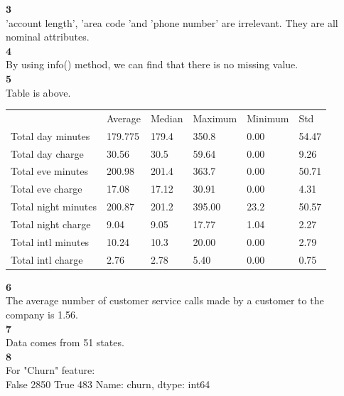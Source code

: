 \documentclass[12pt]{article}
\begin{document}
$\textbf{3}$\\

'account length', 'area code 'and 'phone number' are irrelevant. They are all nominal attributes. \\

$\textbf{4}$\\

By using info() method, we can find that there is no missing value.\\
\newpage
$\textbf{5}$\\

Table is above.\\

\begin{table}
\begin{tabular}{llllll}
                    & Average & Median & Maximum & Minimum & Std   \\
Total day minutes   & 179.775 & 179.4  & 350.8   & 0.00    & 54.47 \\
Total day charge    & 30.56   & 30.5   & 59.64   & 0.00    & 9.26  \\
Total eve minutes   & 200.98  & 201.4  & 363.7   & 0.00    & 50.71 \\
Total eve charge    & 17.08   & 17.12  & 30.91   & 0.00    & 4.31  \\
Total night minutes & 200.87  & 201.2  & 395.00  & 23.2    & 50.57 \\
Total night charge  & 9.04    & 9.05   & 17.77   & 1.04    & 2.27  \\
Total intl minutes  & 10.24   & 10.3   & 20.00   & 0.00    & 2.79  \\
Total intl charge   & 2.76    & 2.78   & 5.40    & 0.00    & 0.75 
\end{tabular}
\end{table}

$\textbf{6}$\\

The average number of customer service calls made by a customer to the company is 1.56.\\

$\textbf{7}$\\

Data comes from 51 states.\\

$\textbf{8}$\\

For "Churn" feature:\\

False    2850
True      483
Name: churn, dtype: int64\\
\end{document}
